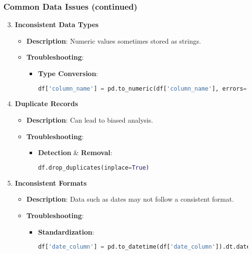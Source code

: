 \documentclass[aspectratio=169]{beamer}
\begin{document}
\begin{frame}[fragile]
    \frametitle{Common Data Issues (continued)}
    \begin{enumerate}
        \setcounter{enumi}{2} %
        \item \textbf{Inconsistent Data Types}
        \begin{itemize}
            \item \textbf{Description}: Numeric values sometimes stored as strings.
            \item \textbf{Troubleshooting}:
            \begin{itemize}
                \item \textbf{Type Conversion}:
                \begin{lstlisting}[language=Python]
                df['column_name'] = pd.to_numeric(df['column_name'], errors='coerce')
                \end{lstlisting}
            \end{itemize}
        \end{itemize}

        \item \textbf{Duplicate Records}
        \begin{itemize}
            \item \textbf{Description}: Can lead to biased analysis.
            \item \textbf{Troubleshooting}:
            \begin{itemize}
                \item \textbf{Detection} & \textbf{Removal}:
                \begin{lstlisting}[language=Python]
                df.drop_duplicates(inplace=True)
                \end{lstlisting}
            \end{itemize}
        \end{itemize}

        \item \textbf{Inconsistent Formats}
        \begin{itemize}
            \item \textbf{Description}: Data such as dates may not follow a consistent format.
            \item \textbf{Troubleshooting}:
            \begin{itemize}
                \item \textbf{Standardization}:
                \begin{lstlisting}[language=Python]
                df['date_column'] = pd.to_datetime(df['date_column']).dt.date
                \end{lstlisting}
            \end{itemize}
        \end{itemize}
    \end{enumerate}
\end{frame}
\end{document}
